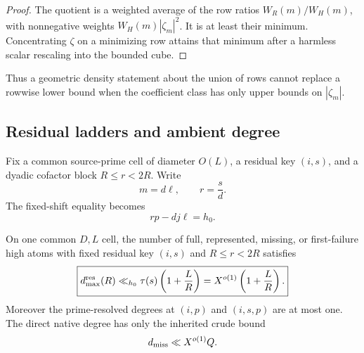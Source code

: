 \begin{proof}
The quotient is a weighted average of the row ratios
\(W_R(m)/W_H(m)\), with nonnegative weights
\(W_H(m)|\zeta_m|^2\).  It is at least their minimum.  Concentrating
\(\zeta\) on a minimizing row attains that minimum after a harmless scalar
rescaling into the bounded cube.
\end{proof}

Thus a geometric density statement about the union of rows cannot replace
a rowwise lower bound when the coefficient class has only upper bounds on
\(|\zeta_m|\).

\subsection{Residual ladders and ambient degree}

Fix a common source-prime cell of diameter \(O(L)\), a residual key
\((i,s)\), and a dyadic cofactor block \(R\le r<2R\).  Write
\begin{equation}
 m=d\ell,
 \qquad r=\frac sd.
 \label{eq:tpc60-d-ell-r}
\end{equation}
The fixed-shift equality becomes
\begin{equation}
 rp-dj\ell=h_0.
 \label{eq:tpc60-determinant-equation}
\end{equation}

\begin{proposition}
\label{prop:tpc60-ambient-residual-degree}
On one common \(D,L\) cell, the number of full, represented, missing, or
first-failure high atoms with fixed residual key \((i,s)\) and
\(R\le r<2R\) satisfies
\begin{equation}
 \boxed{
 d_{\max}^{\rm res}(R)
 \ll_{h_0}\tau(s)\left(1+\frac LR\right)
 =X^{o(1)}\left(1+\frac LR\right).}
 \label{eq:tpc60-residual-degree-bound}
\end{equation}
Moreover the prime-resolved degrees at \((i,p)\) and \((i,s,p)\) are at
most one.  The direct native degree has only the inherited crude bound
\begin{equation}
 d_{\rm miss}\ll X^{o(1)}Q.
 \label{eq:tpc60-crude-native-degree}
\end{equation}
\end{proposition}

